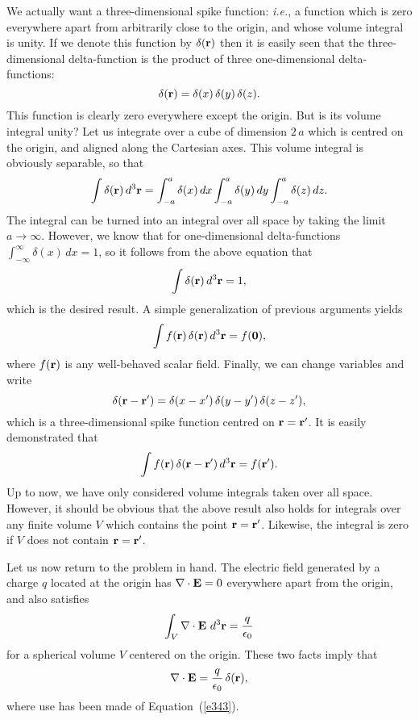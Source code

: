 We actually want a three-dimensional spike function:
{\em i.e.}, a function
 which is zero everywhere
apart from arbitrarily close to the origin, and whose volume integral is unity.
If we denote this function by $\delta({\bf r})$ then it is easily seen that
the three-dimensional delta-function is the product of three one-dimensional
delta-functions:
\begin{equation}
\delta({\bf r}) = \delta(x)\,\delta(y)\,\delta(z).
\end{equation}
This function is clearly zero everywhere except the origin. But is its volume
integral unity? Let us integrate over a cube of dimension $2\,a$ which is 
centred on the origin, and aligned along the Cartesian axes. This
volume integral is obviously separable, so that
\begin{equation}
\int \delta({\bf r})\,d^3{\bf r} = \int_{-a}^{a} \delta(x)\,dx
 \int_{-a}^{a} \delta(y)\,dy \int_{-a}^{a} \delta(z)\,dz.
\end{equation}
The integral can be turned into an integral over all space by taking
the limit $a\rightarrow\infty$. However, we know that for one-dimensional
delta-functions $\int_{-\infty}^{\infty} \delta(x)\,dx = 1$, so it follows
from the above equation that
\begin{equation}\label{e343}
\int \delta({\bf r})\,d^3{\bf r} =1,
\end{equation}
which is the desired result. A simple generalization of previous arguments yields
\begin{equation}
\int f({\bf r})\, \delta({\bf r})\,d^3{\bf r} =f({\bf 0}),
\end{equation}
where $f({\bf r})$ is any well-behaved scalar field. Finally, we can change variables
and write
\begin{equation}
 \delta({\bf r} - {\bf r}') = \delta(x-x')\,\delta(y-y')\,\delta(z-z'),
\end{equation}
which is a three-dimensional  spike function centred on 
${\bf r} = {\bf r}'$. It is easily demonstrated that
\begin{equation}
\int f({\bf r})\,\delta({\bf r}- {\bf r}')\,d^3{\bf r}= f({\bf r}').
\end{equation}
Up to now, we have only considered volume integrals taken
 over all space. However, it
should be obvious that the above result  also holds for integrals
over any finite volume $V$ which contains the point ${\bf r} = {\bf r}'$. Likewise,
the integral is zero if $V$ does not contain ${\bf r} = {\bf r}'$.

Let us now return to the problem in hand. The electric field generated by a charge
$q$ located at the origin has $\nabla\cdot{\bf E}=0$ everywhere apart from the
origin, and also satisfies
\begin{equation}
\int_V {\nabla}\cdot{\bf E}\,\,d^3{\bf r} = \frac{q}{\epsilon_0}
\end{equation}
for a spherical volume $V$ centered on the origin. These two facts imply that
\begin{equation}\label{e348}
\nabla\cdot {\bf E} = \frac{q}{\epsilon_0} \,\delta({\bf r}),
\end{equation}
where use has been made of Equation~(\ref{e343}).

